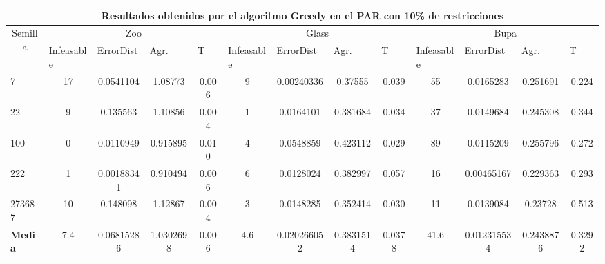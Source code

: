 \begin{table}[H]
	\scriptsize

	\begin{adjustwidth}{-1cm}{-1cm}%
	
	\begin{tabular}{|l|c|c|c|c|c|c|c|c|c|c|c|c|}
	\hline
	\multicolumn{13}{|c|}{\textbf{Resultados obtenidos por el algoritmo Greedy en el PAR con 10\% de restricciones}}                                                                                                                                                                                                                                                                                                                                            \\ \hline
	\multicolumn{1}{|c|}{\multirow{2}{*}{Semilla}} & \multicolumn{4}{c|}{Zoo}                                                                                          & \multicolumn{4}{c|}{Glass}                                                                                         & \multicolumn{4}{c|}{Bupa}                                                                                          \\ \cline{2-13} 
	\multicolumn{1}{|c|}{}                                  & \multicolumn{1}{l|}{Infeasable} & \multicolumn{1}{l|}{ErrorDist} & \multicolumn{1}{l|}{Agr.} & \multicolumn{1}{l|}{T} & \multicolumn{1}{l|}{Infeasable} & \multicolumn{1}{l|}{ErrorDist} & \multicolumn{1}{l|}{Agr.} & \multicolumn{1}{l|}{T} & \multicolumn{1}{l|}{Infeasable} & \multicolumn{1}{l|}{ErrorDist} & \multicolumn{1}{l|}{Agr.} & \multicolumn{1}{l|}{T} \\ \hline
	7   & 17 & 0.0541104 & 1.08773 & 0.006 &  			9 & 0.00240336 & 0.37555 & 0.039 			& 55 & 0.0165283 & 0.251691 & 0.224  \\ \hline
	22 & 9 & 0.135563 & 1.10856 & 0.004 &			1 & 0.0164101 & 0.381684 & 0.034			& 37 & 0.0149684 & 0.245308 & 0.344		\\ \hline
	100 & 0 & 0.0110949 & 0.915895 & 0.010 		&		4 & 0.0548859 & 0.423112 & 0.029			& 89 & 0.0115209 & 0.255796 & 0.272		\\ \hline
	222 & 1 & 0.00188341 & 0.910494 & 0.006     &		6 & 0.0128024 & 0.382997 & 0.057			& 16 & 0.00465167 & 0.229363 & 0.293		\\ \hline
	273687 & 10 & 0.148098 & 1.12867 & 0.004     &  		3 & 0.0148285 & 0.352414 & 0.030			& 11 & 0.0139084 & 0.23728 & 0.513		\\ \hline
	\textbf{Media} & 7.4 & 0.06815286 & 1.0302698 & 0.006		& 4.6 & 0.020266052 & 0.3831514 & 0.0378     & 41.6 & 0.012315534 & 0.2438876 & 0.3292  \\ \hline
	\end{tabular}
	
	\end{adjustwidth}
	
\end{table}	

